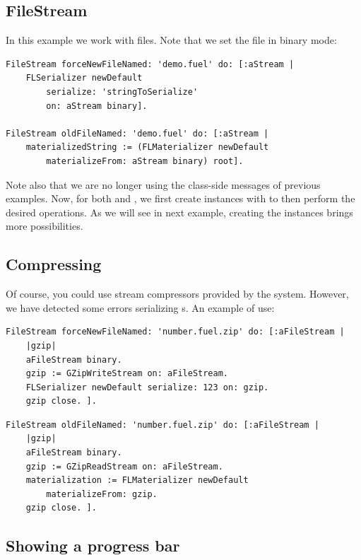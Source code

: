 \documentclass[a4paper,10pt,twoside]{book}
\begin{document}
\subsection{FileStream}

In this example we work with files. Note that we set the file in binary mode:

\begin{lstlisting}
FileStream forceNewFileNamed: 'demo.fuel' do: [:aStream |
	FLSerializer newDefault 
		serialize: 'stringToSerialize' 
 		on: aStream binary].

FileStream oldFileNamed: 'demo.fuel' do: [:aStream |
	materializedString := (FLMaterializer newDefault 
		materializeFrom: aStream binary) root].
\end{lstlisting}

Note also that we are no longer using the class-side messages of previous examples. Now, for both  and , we first create instances with  to then perform the desired operations. As we will see in next example, creating the instances brings more possibilities.

\subsection{Compressing}

Of course, you could use stream compressors provided by the system. However, we have detected some errors serializing s. An example of use:

\begin{lstlisting}
FileStream forceNewFileNamed: 'number.fuel.zip' do: [:aFileStream | 
	|gzip|
	aFileStream binary.
	gzip := GZipWriteStream on: aFileStream.
	FLSerializer newDefault serialize: 123 on: gzip.
	gzip close. ].
\end{lstlisting}
	
\begin{lstlisting}
FileStream oldFileNamed: 'number.fuel.zip' do: [:aFileStream | 
	|gzip|
	aFileStream binary.
	gzip := GZipReadStream on: aFileStream.		
	materialization := FLMaterializer newDefault 
		materializeFrom: gzip.
	gzip close. ].
\end{lstlisting}

\subsection{Showing a progress bar}
\end{document}
